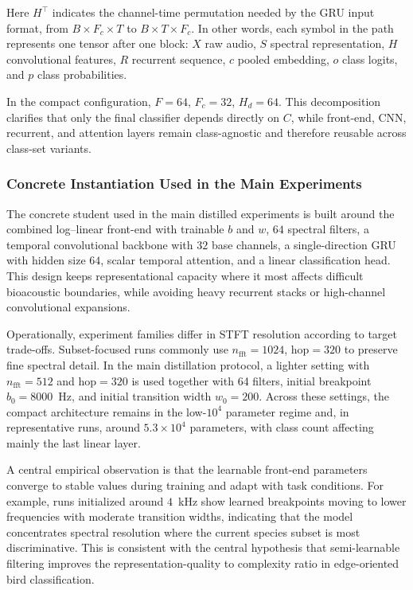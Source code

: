 \documentclass[a4paper,singleside,12pt]{report} %
\begin{document}
	Here \(H^{\top}\) indicates the channel-time permutation needed by the GRU input format, from \(B\times F_c\times T\) to \(B\times T\times F_c\). In other words, each symbol in the path represents one tensor after one block: \(X\) raw audio, \(S\) spectral representation, \(H\) convolutional features, \(R\) recurrent sequence, \(c\) pooled embedding, \(o\) class logits, and \(p\) class probabilities.

	In the compact configuration, \(F=64\), \(F_c=32\), \(H_d=64\). This decomposition clarifies that only the final classifier depends directly on \(C\), while front-end, CNN, recurrent, and attention layers remain class-agnostic and therefore reusable across class-set variants.

	\subsubsection{Concrete Instantiation Used in the Main Experiments}
	The concrete student used in the main distilled experiments is built around the combined log--linear front-end with trainable \(b\) and \(w\), \(64\) spectral filters, a temporal convolutional backbone with \(32\) base channels, a single-direction GRU with hidden size \(64\), scalar temporal attention, and a linear classification head. This design keeps representational capacity where it most affects difficult bioacoustic boundaries, while avoiding heavy recurrent stacks or high-channel convolutional expansions.

	Operationally, experiment families differ in STFT resolution according to target trade-offs. Subset-focused runs commonly use \(n_{\mathrm{fft}}=1024\), \(\mathrm{hop}=320\) to preserve fine spectral detail. In the main distillation protocol, a lighter setting with \(n_{\mathrm{fft}}=512\) and \(\mathrm{hop}=320\) is used together with 64 filters, initial breakpoint \(b_0=8000\)~Hz, and initial transition width \(w_0=200\). Across these settings, the compact architecture remains in the low-\(10^4\) parameter regime and, in representative runs, around \(5.3\times10^4\) parameters, with class count affecting mainly the last linear layer.

	A central empirical observation is that the learnable front-end parameters converge to stable values during training and adapt with task conditions. For example, runs initialized around \(4\)~kHz show learned breakpoints moving to lower frequencies with moderate transition widths, indicating that the model concentrates spectral resolution where the current species subset is most discriminative. This is consistent with the central hypothesis that semi-learnable filtering improves the representation-quality to complexity ratio in edge-oriented bird classification.
\end{document}
